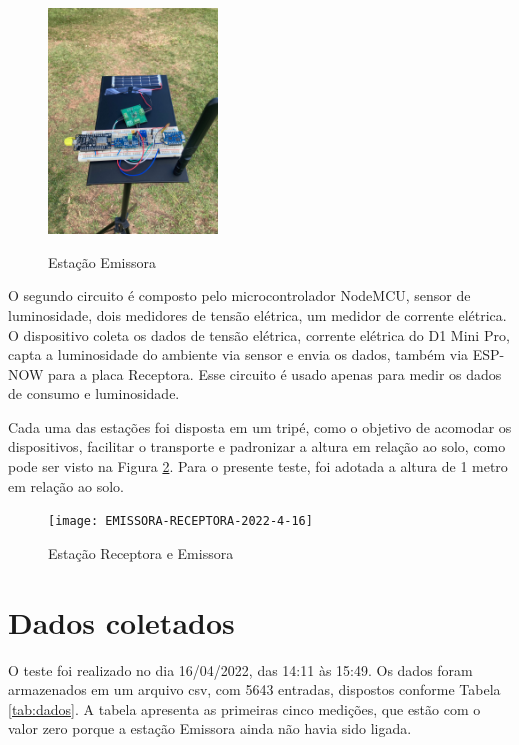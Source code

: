 \documentclass[11pt,a4paper]{article}
\begin{document}
\begin{figure}[hbt]
	\centering
		\caption{Estação Emissora}
		\includegraphics[width=0.4\textwidth]{EMISSORA-2022-4-16} 
		\label{fig:emissora} 
\end{figure} 


O segundo circuito é composto pelo microcontrolador NodeMCU, sensor de luminosidade, dois medidores de tensão elétrica, um medidor de corrente elétrica. O dispositivo coleta os dados de tensão elétrica, corrente elétrica do D1 Mini Pro, capta a luminosidade do ambiente via sensor e envia os dados, também via ESP-NOW para a placa Receptora. Esse circuito é usado apenas para medir os dados  de consumo e luminosidade. 

Cada uma das estações foi disposta em um tripé, como o objetivo de acomodar os dispositivos, facilitar o transporte e padronizar a altura em relação ao solo, como pode ser visto na Figura \ref{fig:emissorareceptora}. Para o presente teste, foi adotada a altura de 1 metro em relação ao solo.

\begin{figure}[hbt]
	\centering
		\caption{Estação Receptora e Emissora}
		\texttt{[image: EMISSORA-RECEPTORA-2022-4-16]} 
		\label{fig:emissorareceptora} 
\end{figure}  



\section{Dados coletados}

O teste foi realizado no dia 16/04/2022, das 14:11 às 15:49. Os dados foram armazenados em um arquivo csv, com 5643 entradas, dispostos conforme Tabela \ref{tab:dados}. A tabela apresenta as primeiras cinco medições, que estão com o valor zero porque a estação Emissora ainda não havia sido ligada.
\end{document}
